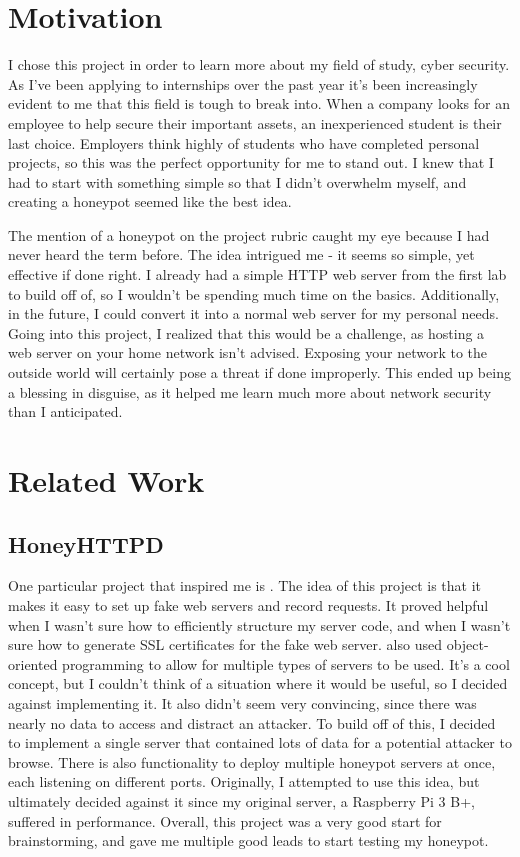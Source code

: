 \documentclass[12pt]{article}
\begin{document}
\section{Motivation}
I chose this project in order to learn more about my field of study, cyber security.
As I've been applying to internships over the past year it's been increasingly evident to me that this field is tough to break into.
When a company looks for an employee to help secure their important assets, an inexperienced student is their last choice.
Employers think highly of students who have completed personal projects, so this was the perfect opportunity for me to stand out.
I knew that I had to start with something simple so that I didn't overwhelm myself, and creating a honeypot seemed like the best idea.

The mention of a honeypot on the project rubric caught my eye because I had never heard the term before.
The idea intrigued me - it seems so simple, yet effective if done right.
I already had a simple HTTP web server from the first lab to build off of, so I wouldn't be spending much time on the basics.
Additionally, in the future, I could convert it into a normal web server for my personal needs.
Going into this project, I realized that this would be a challenge, as hosting a web server on your home network isn't advised.
Exposing your network to the outside world will certainly pose a threat if done improperly.
This ended up being a blessing in disguise, as it helped me learn much more about network security than I anticipated.


\section{Related Work}
\subsection{HoneyHTTPD}
One particular project that inspired me is .
The idea of this project is that it makes it easy to set up fake web servers and record requests.
It proved helpful when I wasn't sure how to efficiently structure my server code, and when I wasn't sure how to generate SSL certificates for the fake web server.
\textcite{honeyhttpd} also used object-oriented programming to allow for multiple types of servers to be used.
It's a cool concept, but I couldn't think of a situation where it would be useful, so I decided against implementing it.
It also didn't seem very convincing, since there was nearly no data to access and distract an attacker.
To build off of this, I decided to implement a single server that contained lots of data for a potential attacker to browse.
There is also functionality to deploy multiple honeypot servers at once, each listening on different ports.
Originally, I attempted to use this idea, but ultimately decided against it since my original server, a Raspberry Pi 3 B+, suffered in performance.
Overall, this project was a very good start for brainstorming, and gave me multiple good leads to start testing my honeypot.
\end{document}
